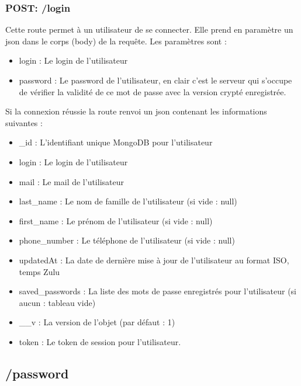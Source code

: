 \documentclass[12pt]{report}
\begin{document}
	\subsubsection{POST: /login}
	Cette route permet à un utilisateur de se connecter. Elle prend en paramètre un \gls{json} dans le corps (body) de la requête. Les paramètres sont : 
	\begin{itemize}
		\item login : Le login de l'utilisateur
		\item password : Le password de l'utilisateur, en clair c'est le serveur qui s'occupe de vérifier la validité de ce mot de passe avec la version crypté enregistrée.
	\end{itemize}
	Si la connexion réussie la route renvoi un \gls{json} contenant les informations suivantes : 
	\begin{itemize}
		\item \_id : L'identifiant unique MongoDB pour l'utilisateur
		\item login : Le login de l'utilisateur
		\item mail : Le mail de l'utilisateur
		\item last\_name : Le nom de famille de l'utilisateur (si vide : null)
		\item first\_name : Le prénom de l'utilisateur (si vide : null)
		\item phone\_number : Le téléphone de l'utilisateur (si vide : null)
		\item updatedAt : La date de dernière mise à jour de l'utilisateur au format ISO, temps Zulu
		\item saved\_passwords : La liste des mots de passe enregistrés pour l'utilisateur (si aucun : tableau vide)
		\item \_\_v : La version de l'objet (par défaut : 1)
		\item token : Le token de session pour l'utilisateur.
	\end{itemize}
	\subsection{/password}
\end{document}
